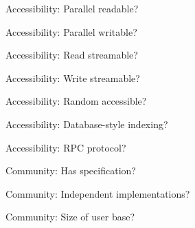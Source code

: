 \documentclass[aspectratio=169]{beamer}
\begin{document}
\begin{frame}{Accessibility: Parallel readable?}
\vspace{0.5 cm}
\end{frame}

\begin{frame}{Accessibility: Parallel writable?}
\vspace{0.5 cm}
\end{frame}

\begin{frame}{Accessibility: Read streamable?}
\vspace{0.5 cm}
\end{frame}

\begin{frame}{Accessibility: Write streamable?}
\vspace{0.5 cm}
\end{frame}

\begin{frame}{Accessibility: Random accessible?}
\vspace{0.5 cm}
\end{frame}

\begin{frame}{Accessibility: Database-style indexing?}
\vspace{0.5 cm}
\end{frame}

\begin{frame}{Accessibility: RPC protocol?}
\vspace{0.5 cm}
\end{frame}

\begin{frame}{Community: Has specification?}
\vspace{0.5 cm}
\end{frame}

\begin{frame}{Community: Independent implementations?}
\vspace{0.5 cm}
\end{frame}

\begin{frame}{Community: Size of user base?}
\vspace{0.5 cm}
\end{frame}
\end{document}
